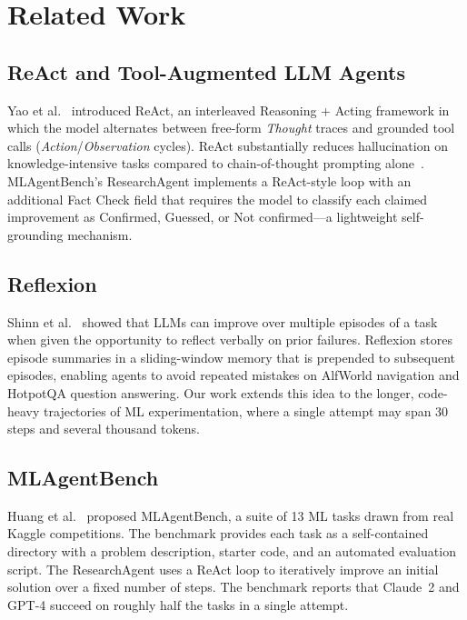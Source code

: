 \documentclass[conference]{IEEEtran}
\begin{document}
\section{Related Work}

\subsection{ReAct and Tool-Augmented LLM Agents}

Yao et al.~\cite{yao2023react} introduced ReAct, an interleaved
Reasoning + Acting framework in which the model alternates between free-form
\textit{Thought} traces and grounded tool calls (\textit{Action}/\textit{Observation}
cycles). ReAct substantially reduces hallucination on knowledge-intensive tasks
compared to chain-of-thought prompting alone~\cite{wei2022chain}.
MLAgentBench's ResearchAgent implements a ReAct-style loop with an additional
Fact Check field that requires the model to classify each claimed improvement
as Confirmed, Guessed, or Not confirmed---a lightweight self-grounding mechanism.

\subsection{Reflexion}

Shinn et al.~\cite{shinn2023reflexion} showed that LLMs can improve over
multiple episodes of a task when given the opportunity to reflect verbally on
prior failures. Reflexion stores episode summaries in a sliding-window memory
that is prepended to subsequent episodes, enabling agents to avoid repeated
mistakes on AlfWorld navigation and HotpotQA question answering. Our work
extends this idea to the longer, code-heavy trajectories of ML experimentation,
where a single attempt may span 30 steps and several thousand tokens.

\subsection{MLAgentBench}

Huang et al.~\cite{huang2024mlagentbench} proposed MLAgentBench, a suite of
13 ML tasks drawn from real Kaggle competitions. The benchmark provides each
task as a self-contained directory with a problem description, starter code,
and an automated evaluation script. The ResearchAgent uses a ReAct loop to
iteratively improve an initial solution over a fixed number of steps. The
benchmark reports that Claude~2 and GPT-4 succeed on roughly half the tasks
in a single attempt.
\end{document}
